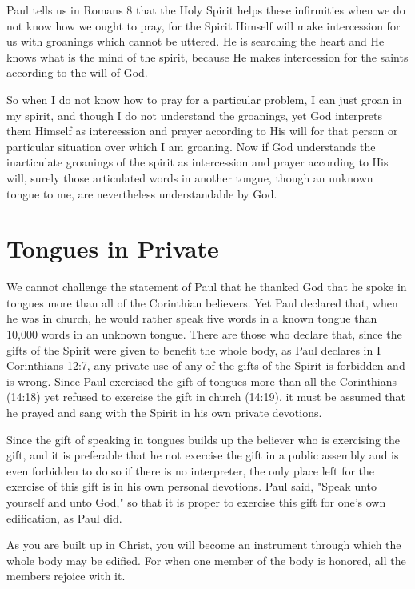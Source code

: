 Paul tells us in Romans 8 that the Holy Spirit helps these infirmities when we do not know how we ought to pray, for the Spirit Himself will make intercession for us with groanings which cannot be uttered. He is searching the heart and He knows what is the mind of the spirit, because He makes intercession for the saints according to the will of God. 

So when I do not know how to pray for a particular problem, I can just groan in my spirit, and though I do not understand the groanings, yet God interprets them Himself as intercession and prayer according to His will for that person or particular situation over which I am groaning. Now if God understands the inarticulate groanings of the spirit as intercession and prayer according to His will, surely those articulated words in another tongue, though an unknown tongue to me, are nevertheless understandable by God. 

\section*{Tongues in Private}

We cannot challenge the statement of Paul that he thanked God that he spoke in tongues more than all of the Corinthian believers. Yet Paul declared that, when he was in church, he would rather speak five words in a known tongue than 10,000 words in an unknown tongue. There are those who declare that, since the gifts of the Spirit were given to benefit the whole body, as Paul declares in I Corinthians 12:7, any private use of any of the gifts of the Spirit is forbidden and is wrong. Since Paul exercised the gift of tongues more than all the Corinthians (14:18) yet refused to exercise the gift in church (14:19), it must be assumed that he prayed and sang with the Spirit in his own private devotions. 

Since the gift of speaking in tongues builds up the believer who is exercising the gift, and it is preferable that he not exercise the gift in a public assembly and is even forbidden to do so if there is no interpreter, the only place left for the exercise of this gift is in his own personal devotions. Paul said, "Speak unto yourself and unto God," so that it is proper to exercise this gift for one's own edification, as Paul did. 

As you are built up in Christ, you will become an instrument through which the whole body may be edified. For when one member of the body is honored, all the members rejoice with it. 

